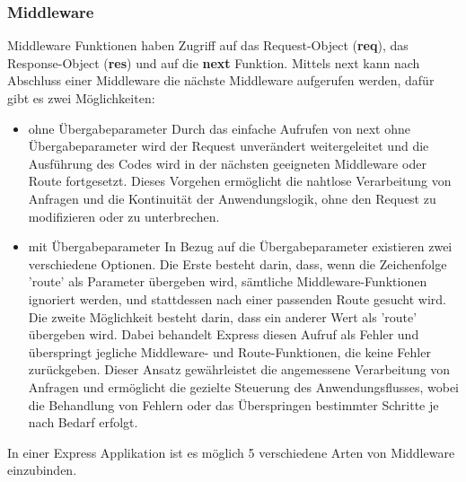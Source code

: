 \subsubsection{Middleware}
Middleware Funktionen haben Zugriff auf das Request-Object (\textbf{req}), das Response-Object (\textbf{res}) und auf die \textbf{next} Funktion. Mittels next kann nach Abschluss einer Middleware die nächste Middleware aufgerufen werden, dafür gibt es zwei Möglichkeiten:
\begin{itemize}
    \item ohne Übergabeparameter
        \newline
        Durch das einfache Aufrufen von next ohne Übergabeparameter wird der Request unverändert weitergeleitet und die Ausführung des Codes wird in der nächsten geeigneten Middleware oder Route fortgesetzt. Dieses Vorgehen ermöglicht die nahtlose Verarbeitung von Anfragen und die Kontinuität der Anwendungslogik, ohne den Request zu modifizieren oder zu unterbrechen.
    \item mit Übergabeparameter
        \newline
        In Bezug auf die Übergabeparameter existieren zwei verschiedene Optionen. Die Erste besteht darin, dass, wenn die Zeichenfolge 'route' als Parameter übergeben wird, sämtliche Middleware-Funktionen ignoriert werden, und stattdessen nach einer passenden Route gesucht wird. Die zweite Möglichkeit besteht darin, dass ein anderer Wert als 'route' übergeben wird. Dabei behandelt Express diesen Aufruf als Fehler und überspringt jegliche Middleware- und Route-Funktionen, die keine Fehler zurückgeben. Dieser Ansatz gewährleistet die angemessene Verarbeitung von Anfragen und ermöglicht die gezielte Steuerung des Anwendungsflusses, wobei die Behandlung von Fehlern oder das Überspringen bestimmter Schritte je nach Bedarf erfolgt.
\end{itemize}
\newpage
In einer Express Applikation ist es möglich 5 verschiedene Arten von Middleware einzubinden.

